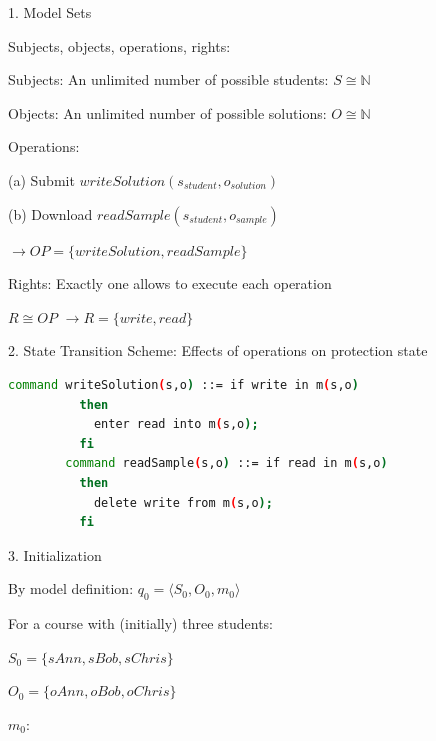 \documentclass[a4paper]{article}
\begin{document}
\begin{multicols}{3}
    1. Model Sets
    \begin{itemize*}
        \item Subjects, objects, operations, rights:
        \begin{itemize*}
            \item Subjects: An unlimited number of possible students: $S\cong\mathbb{N}$
            \item Objects: An unlimited number of possible solutions: $O\cong\mathbb{N}$
            \item Operations:
            \begin{itemize*}
                \item (a) Submit $writeSolution(s_{student},o_{solution})$
                \item (b) Download $readSample(s_{student},o_{sample})$
                \item $\rightarrow OP=\{writeSolution, readSample\}$
            \end{itemize*}
            \item Rights: Exactly one allows to execute each operation
            \begin{itemize*}
                \item $R\cong OP$ $\rightarrow R=\{write, read\}$
            \end{itemize*}
        \end{itemize*}
    \end{itemize*}
    2. State Transition Scheme: Effects of operations on protection state
    \begin{lstlisting}[language=Bash,showspaces=false]
        command writeSolution(s,o) ::= if write in m(s,o) 
          then 
            enter read into m(s,o);
          fi
        command readSample(s,o) ::= if read in m(s,o)
          then
            delete write from m(s,o);
          fi
  \end{lstlisting}
    3. Initialization
    \begin{itemize*}
        \item By model definition: $q_0 =\langle S_0 ,O_0 ,m_0 \rangle$
        \item For a course with (initially) three students:
        \begin{itemize*}
            \item $S_0 =\{sAnn, sBob, sChris\}$
            \item $O_0 =\{oAnn, oBob, oChris\}$
            \item $m_0$:
            \begin{itemize*}

\end{itemize*}
\end{itemize*}
\end{itemize*}
\end{multicols}
\end{document}
